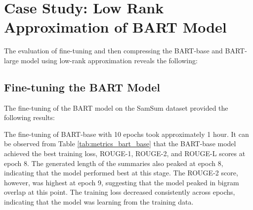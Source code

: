 
\section{Case Study: Low Rank Approximation of BART Model}
The evaluation of fine-tuning and then compressing the BART-base and BART-large model using low-rank approximation reveals the following:

\subsection{Fine-tuning the BART Model}
The fine-tuning of the BART model on the SamSum dataset provided the following results:
\begin{table}[h!]
    \centering
    \caption{Training and Validation Metrics of Fine-Tuning BART-base across Epochs}
    \label{tab:metrics_bart_base}
\end{table}
    The fine-tuning of BART-base with 10 epochs took approximately 1 hour. It can be observed from Table \ref{tab:metrics_bart_base} that the BART-base model achieved the best training loss, ROUGE-1, ROUGE-2, and ROUGE-L scores at epoch 8. The generated length of the summaries also peaked at epoch 8, indicating that the model performed best at this stage. The ROUGE-2 score, however, was highest at epoch 9, suggesting that the model peaked in bigram overlap at this point. The training loss decreased consistently across epochs, indicating that the model was learning from the training data.

